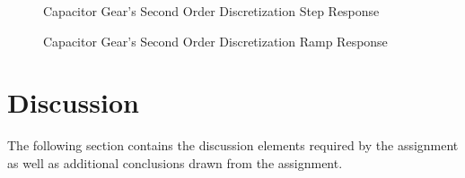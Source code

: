 \documentclass[10pt, oneside, letterpaper]{article}
\begin{document}
\begin{figure}[H]
  \begin{center}
    
  \end{center}
  \caption{Capacitor Gear's Second Order Discretization Step Response}
  \label{gear_step}
\end{figure}

\begin{figure}[H]
  \begin{center}
    
  \end{center}
  \caption{Capacitor Gear's Second Order Discretization Ramp Response}
  \label{gear_ramp}
\end{figure}

\newpage
\section{Discussion}

The following section contains the discussion elements required by the assignment as well as additional conclusions drawn from the assignment.
\end{document}
